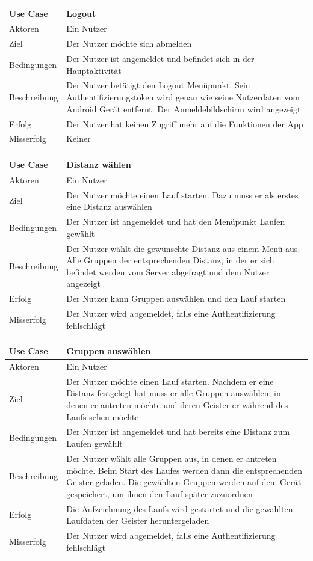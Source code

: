 \begin{tabular}{|p{}|p{}|}
\hline
\textbf{Use Case} & \textbf{Logout} \\ \hline
Aktoren &  Ein Nutzer \\ \hline
Ziel &  Der Nutzer möchte sich abmelden \\ \hline
Bedingungen &  Der Nutzer ist angemeldet und befindet sich in der Hauptaktivität \\ \hline
Beschreibung & Der Nutzer betätigt den Logout Menüpunkt. Sein Authentifizierungstoken wird genau wie seine Nutzerdaten vom Android Gerät entfernt. Der Anmeldebildschirm wird angezeigt \\ \hline
Erfolg & Der Nutzer hat keinen Zugriff mehr auf die Funktionen der App\\ \hline
Misserfolg & Keiner \\ \hline
\hline \end{tabular}
\begin{tabular}{|p{}|p{}|}
\hline
\textbf{Use Case} & \textbf{Distanz wählen} \\ \hline
Aktoren &  Ein Nutzer \\ \hline
Ziel &  Der Nutzer möchte einen Lauf starten. Dazu muss er als erstes eine Distanz auswählen \\ \hline
Bedingungen &  Der Nutzer ist angemeldet und hat den Menüpunkt Laufen gewählt \\ \hline
Beschreibung & Der Nutzer wählt die gewünschte Distanz aus einem Menü aus. Alle Gruppen der entsprechenden Distanz, in der er sich befindet werden vom Server abgefragt und dem Nutzer angezeigt \\ \hline
Erfolg & Der Nutzer kann Gruppen auswählen und den Lauf starten\\ \hline
Misserfolg & Der Nutzer wird abgemeldet, falls eine Authentifizierung fehlschlägt \\ \hline
\hline \end{tabular}
\begin{tabular}{|p{}|p{}|}
\hline
\textbf{Use Case} & \textbf{Gruppen auswählen} \\ \hline
Aktoren &  Ein Nutzer \\ \hline
Ziel &  Der Nutzer möchte einen Lauf starten. Nachdem er eine Distanz festgelegt hat muss er alle Gruppen auswählen, in denen er antreten möchte und deren Geister er während des Laufs sehen möchte \\ \hline
Bedingungen &  Der Nutzer ist angemeldet und hat bereits eine Distanz zum Laufen gewählt \\ \hline
Beschreibung & Der Nutzer wählt alle Gruppen aus, in denen er antreten möchte. Beim Start des Laufes werden dann die entsprechenden Geister geladen. Die gewählten Gruppen werden auf dem Gerät gespeichert, um ihnen den Lauf später zuzuordnen \\ \hline
Erfolg & Die Aufzeichnung des Laufs wird gestartet und die gewählten Laufdaten der Geister heruntergeladen \\ \hline
Misserfolg & Der Nutzer wird abgemeldet, falls eine Authentifizierung fehlschlägt \\ \hline
\hline \end{tabular}
